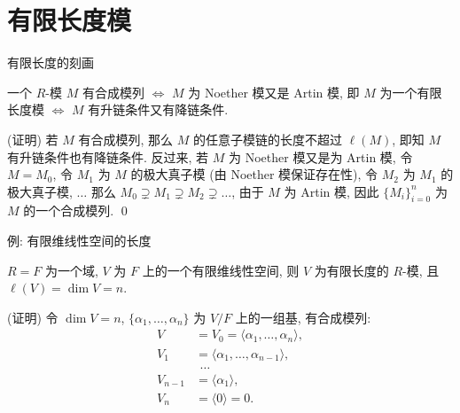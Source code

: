 
\section[有限长度]{有限长度模}


\begin{frame}{有限长度的刻画}

\begin{lem}[有限长度的刻画]
一个 $R$-模 $M$ 有合成模列 $\iff$ $M$ 为 Noether 模又是 Artin 模,
即 $M$ 为一个有限长度模 $\iff$ $M$ 有升链条件又有降链条件.
\end{lem}

\startproof[bg=yellow, fg=red](证明)
若 $M$ 有合成模列, 那么 $M$ 的任意子模链的长度不超过 $\ell(M)$,
即知 $M$ 有升链条件也有降链条件.
反过来, 若 $M$ 为 Noether 模又是为 Artin 模,
令 $M = M_0$, 令 $M_1$ 为 $M$ 的极大真子模 (由 Noether 模保证存在性),
令 $M_2$ 为 $M_1$ 的极大真子模, $\dots$
那么 $M_0 \supsetneq M_1 \supsetneq M_2 \supsetneq \dots$,
由于 $M$ 为 Artin 模,
因此 $\{M_i\}_{i=0}^{n}$ 为 $M$ 的一个合成模列.
\qed

\end{frame}


\begin{frame}{例: 有限维线性空间的长度}

\begin{eg}[有限维线性空间的长度]
$R = F$ 为一个域, $V$ 为 $F$ 上的一个有限维线性空间,
则 $V$ 为有限长度的 $R$-模, 且 $\ell(V) = \dim V = n$.
\end{eg}

\startproof[bg=yellow, fg=red](证明)
令 $\dim V = n$, $\{ \alpha_1, \dots, \alpha_n \}$ 为 $V/F$
上的一组基, 有合成模列:
\[
\begin{aligned}
V &= V_0 = \langle \alpha_1, \dots, \alpha_n \rangle, \\
V_1 &= \langle \alpha_1, \dots, \alpha_{n-1} \rangle, \\
&\ \,\dots \\
V_{n-1} &= \langle \alpha_1 \rangle, \\
V_n &= \langle 0 \rangle = 0.
\end{aligned}
\]

\end{frame}



